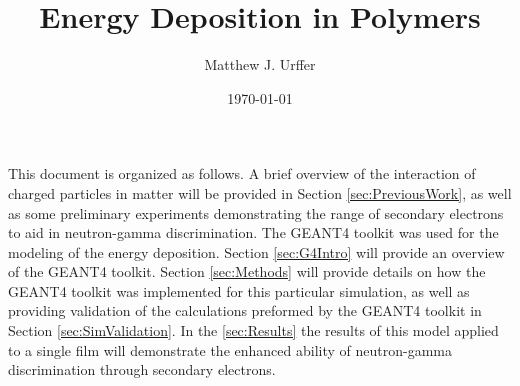 \documentclass[]{article}
\title{Energy Deposition in Polymers}
\author{Matthew J. Urffer}
\date{\today}
\numberwithin{equation}{section}
\begin{document}
\maketitle

\listoftodos

\tableofcontents
\listoffigures
\listoftables


This document is organized as follows.
A brief overview of the interaction of charged particles in matter will be provided in Section \ref{sec:PreviousWork}, as well as some preliminary experiments demonstrating the range of secondary electrons to aid in neutron-gamma discrimination.
The GEANT4 toolkit was used for the modeling of the energy deposition.  Section \ref{sec:G4Intro} will provide an overview of the GEANT4 toolkit.
Section \ref{sec:Methods} will provide details on how the GEANT4 toolkit was implemented for this particular simulation, as well as providing validation of the calculations preformed by the GEANT4 toolkit in Section \ref{sec:SimValidation}.
In the \ref{sec:Results} the results of this model applied to a single film will demonstrate the enhanced ability of neutron-gamma discrimination through secondary electrons.








\appendix

\end{document}
